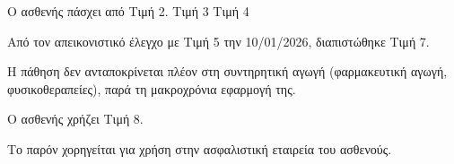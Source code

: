 \documentclass[10pt,greek]{article}
\begin{document}
\begin{PatientInfo}
\end{PatientInfo}

Ο ασθενής πάσχει από Τιμή 2.
Τιμή 3
Τιμή 4

Από τον απεικονιστικό έλεγχο με Τιμή 5 την 10/01/2026, διαπιστώθηκε Τιμή 7.

Η πάθηση δεν ανταποκρίνεται πλέον στη συντηρητική αγωγή (φαρμακευτική αγωγή, φυσικοθεραπείες), παρά τη μακροχρόνια εφαρμογή της.

Ο ασθενής χρήζει Τιμή 8.



Το παρόν χορηγείται για χρήση στην ασφαλιστική εταιρεία του ασθενούς.
\end{document}
